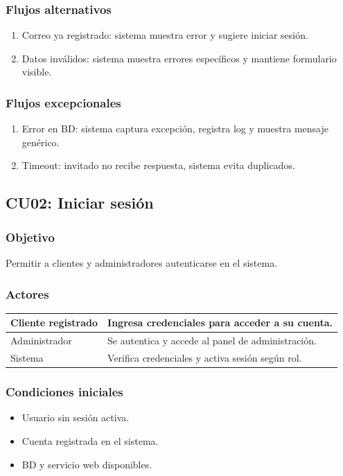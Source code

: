 \documentclass[12pt,a4paper]{article}
\begin{document}
\subsubsection*{Flujos alternativos}
\begin{enumerate}[label=FA-\arabic*]
    \item Correo ya registrado: sistema muestra error y sugiere iniciar sesión.
    \item Datos inválidos: sistema muestra errores específicos y mantiene formulario visible.
\end{enumerate}

\subsubsection*{Flujos excepcionales}
\begin{enumerate}[label=FE-\arabic*]
    \item Error en BD: sistema captura excepción, registra log y muestra mensaje genérico.
    \item Timeout: invitado no recibe respuesta, sistema evita duplicados.
\end{enumerate}


\subsection{CU02: Iniciar sesión}
\subsubsection*{Objetivo}
Permitir a clientes y administradores autenticarse en el sistema.

\subsubsection*{Actores}
\begin{longtable}{|l|p{10cm}|}
    \hline
    Cliente registrado & Ingresa credenciales para acceder a su cuenta.    \\ \hline
    Administrador      & Se autentica y accede al panel de administración. \\ \hline
    Sistema            & Verifica credenciales y activa sesión según rol.  \\ \hline
\end{longtable}

\subsubsection*{Condiciones iniciales}
\begin{itemize}[label=--]
    \item Usuario sin sesión activa.
    \item Cuenta registrada en el sistema.
    \item BD y servicio web disponibles.
\end{itemize}
\end{document}
